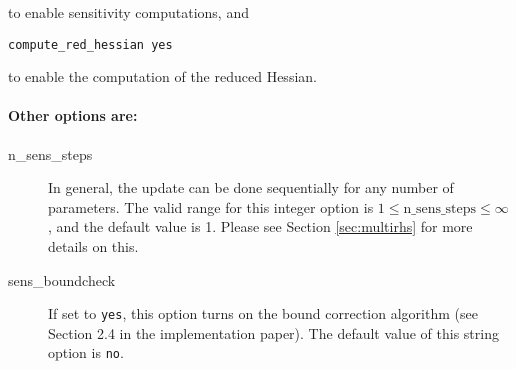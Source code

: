 \documentclass[letter, 11pt]{article}
\newcommand{\redhessopt}{compute\_red\_hessian}
\newcommand{\selectstep}{select\_step}
\newcommand{\nstepsopt}{n\_sens\_steps}
\newcommand{\boundcheckopt}{sens\_boundcheck}
\begin{document}
\noindent to enable sensitivity computations, and

\begin{description}
  \item \texttt{{\redhessopt} yes}
\end{description}

\noindent to enable the computation of the reduced Hessian.

\paragraph{Other options are:}

\begin{description}

%
%

\item[\nstepsopt] In general, the update can be done sequentially for any number of parameters.
				  The valid range for this integer option is $1 \leq \mbox{\nstepsopt} \leq \infty$,
                  and the default value is 1. Please see Section \ref{sec:multirhs} for more details on this.

\item[\boundcheckopt] If set to \texttt{yes}, this option turns on the bound correction algorithm (see Section 2.4 in the
           implementation paper). The default value of this string option is \texttt{no}.


\end{description}
\end{document}
